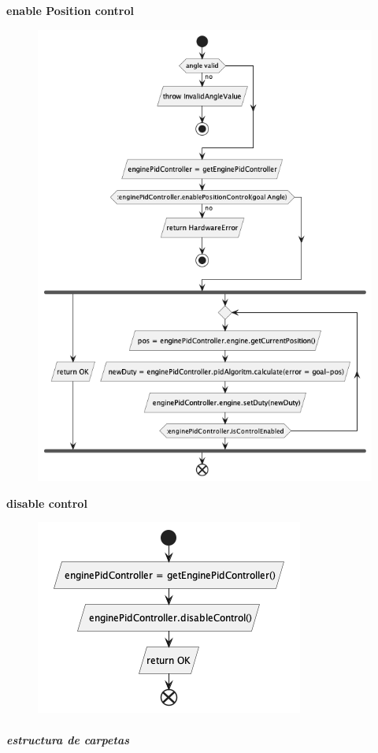 \textbf{enable Position control}

\begin{figure}[H]
    \centering
    \includegraphics[height=0.4\textheight]{./part/Proyecto_ejecutivo/memoria_descriptiva/descripcionDelProyecto/control/uml/enablePositionControl}
    \caption[Diagrama de objetos de dominio]{}\label{fig:enablePositionControl}
\end{figure}

\textbf{disable control}

\begin{figure}[H]
    \centering
    \includegraphics[height=0.2\textheight]{./part/Proyecto_ejecutivo/memoria_descriptiva/descripcionDelProyecto/control/uml/disableControl}
    \caption[Diagrama de objetos de dominio]{}\label{fig:disableControl}
\end{figure}

\subparagraph{estructura de carpetas}







